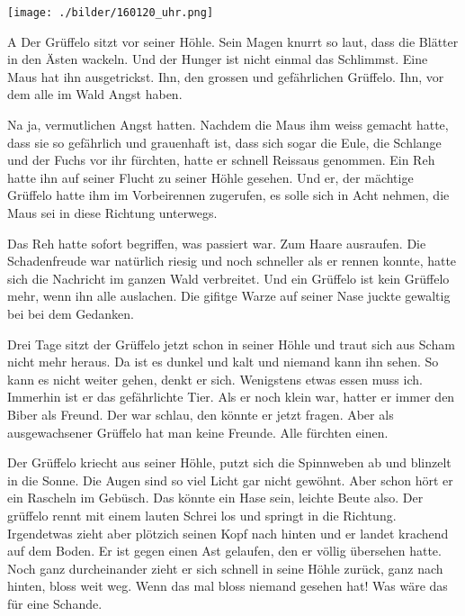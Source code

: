 \thispagestyle{empty}
\begin{center}
\texttt{[image: ./bilder/160120\_uhr.png]}
\end{center}
\vskip 2cm
{\Huge\color{farbe}\hfill{}}
\newpage
\lettrine[lines=2, lhang=.2, loversize=.25, lraise=0.05, findent=0.1em,
nindent=0em]{A}{}
Der Grüffelo sitzt vor seiner Höhle. Sein Magen knurrt so laut, dass die Blätter in den Ästen wackeln. Und der Hunger ist nicht einmal das Schlimmst. Eine Maus hat ihn ausgetrickst. Ihn, den grossen und gefährlichen Grüffelo. Ihn, vor dem alle im Wald Angst haben. 

Na ja, vermutlichen Angst hatten. Nachdem die Maus ihm weiss gemacht hatte, dass sie so gefährlich und grauenhaft ist, dass sich sogar die Eule, die Schlange und der Fuchs vor ihr fürchten, hatte er schnell Reissaus genommen. Ein Reh hatte ihn auf seiner Flucht zu seiner Höhle gesehen. Und er, der mächtige Grüffelo hatte ihm im Vorbeirennen zugerufen, es solle sich in Acht nehmen, die Maus sei in diese Richtung unterwegs. 

Das Reh hatte sofort begriffen, was passiert war. Zum Haare ausraufen. Die Schadenfreude war natürlich riesig und noch schneller als er rennen konnte, hatte sich die Nachricht im ganzen Wald verbreitet. Und ein Grüffelo ist kein Grüffelo mehr, wenn ihn alle auslachen. Die gifitge Warze auf seiner Nase juckte gewaltig bei bei dem Gedanken. 

Drei Tage sitzt der Grüffelo jetzt schon in seiner Höhle und traut sich aus Scham nicht mehr heraus. Da ist es dunkel und kalt und niemand kann ihn sehen. So kann es nicht weiter gehen, denkt er sich. Wenigstens etwas essen muss ich. Immerhin ist er das gefährlichte Tier. Als er noch klein war, hatter er immer den Biber als Freund. Der war schlau, den könnte er jetzt fragen. Aber als ausgewachsener Grüffelo hat man keine Freunde. Alle fürchten einen.

Der Grüffelo kriecht aus seiner Höhle, putzt sich die Spinnweben ab und blinzelt in die Sonne. Die Augen sind so viel Licht gar nicht gewöhnt. Aber schon hört er ein Rascheln im Gebüsch. Das könnte ein Hase sein, leichte Beute also. Der grüffelo rennt mit einem lauten Schrei los und springt in die Richtung. Irgendetwas zieht aber plötzich seinen Kopf nach hinten und er landet krachend auf dem Boden. Er ist gegen einen Ast gelaufen, den er völlig übersehen hatte. Noch ganz durcheinander zieht er sich schnell in seine Höhle zurück, ganz nach hinten, bloss weit weg. Wenn das mal bloss niemand gesehen hat! Was wäre das für eine Schande.


